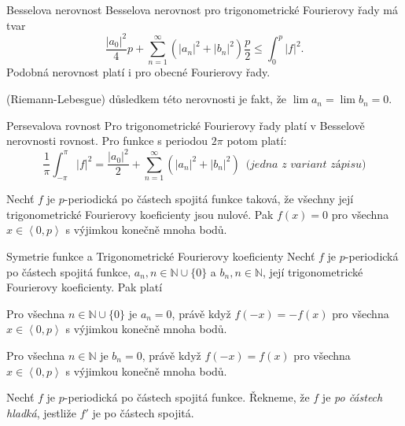 \begin{poznamkaN}{Besselova nerovnost}
Besselova nerovnost pro trigonometrické Fourierovy řady má tvar
$$\frac{|a_0|^2}{4}p + \sum_{n=1}^{\infty} (|a_n|^2 + |b_n|^2)\frac{p}{2} \le \int_0^p |f|^2.$$
Podobná nerovnost platí i pro obecné Fourierovy řady.
\par\medskip\noindent
(Riemann-Lebesgue) důsledkem této nerovnosti je fakt, že $\lim a_n = \lim b_n = 0$.
\end{poznamkaN}

\begin{vetaN}{Persevalova rovnost}
Pro trigonometrické Fourierovy řady platí v Besselově nerovnosti rovnost. Pro funkce s periodou $2\pi$ potom platí:
$$\frac{1}{\pi} \int_{-\pi}^{\pi} |f|^2= \frac{|a_0|^2}{2}+\sum_{n=1}^{\infty} (|a_n|^2 + |b_n|^2) \,\,\,\textit{(jedna z variant zápisu)}$$
\end{vetaN}

\begin{poznamka}
Nechť $f$ je $p$-periodická po částech spojitá funkce taková, že všechny její trigonometrické Fourierovy koeficienty jsou nulové. Pak $f(x)=0$ pro všechna $x \in \left<0,p\right>$ s výjimkou konečně mnoha bodů.
\end{poznamka}

\begin{vetaN}{Symetrie funkce a Trigonometrické Fourierovy koeficienty}
Nechť $f$ je $p$-periodická po částech spojitá funkce, $a_n, n \in \mathbb{N} \cup \{0\}$ a $b_n, n \in \mathbb{N}$, její trigonometrické Fourierovy koeficienty. Pak platí
\begin{penumerate}
	\item Pro všechna $n \in \mathbb{N} \cup \{0\}$ je $a_n=0$, právě když $f(-x) = -f(x)$ pro všechna $x \in \left<0,p\right>$ s výjimkou konečně mnoha bodů.
	\item Pro všechna $n \in \mathbb{N}$ je $b_n=0$, právě když $f(-x) = f(x)$ pro všechna $x \in \left<0,p\right>$ s výjimkou konečně mnoha bodů.
\end{penumerate}
\end{vetaN}

\begin{definice}
Nechť $f$ je $p$-periodická po částech spojitá funkce. Řekneme, že $f$ je \emph{po částech hladká}, jestliže $f'$ je po částech spojitá.
\end{definice}

